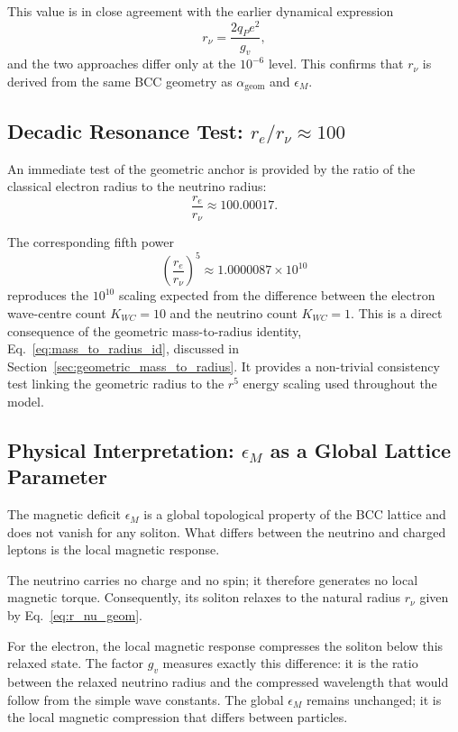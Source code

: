 \documentclass[10pt,a4paper]{article}
\begin{document}
This value is in close agreement with the earlier dynamical expression
\begin{equation}
	r_\nu = \frac{2 q_P e^2}{g_v},
\end{equation}
and the two approaches differ only at the \(10^{-6}\) level. This confirms that \(r_\nu\) is derived from the same BCC geometry as \(\alpha_{\text{geom}}\) and \(\epsilon_M\).

\subsection{Decadic Resonance Test: \(r_e / r_\nu \approx 100\)}
\label{sec:decadic_test}

An immediate test of the geometric anchor is provided by the ratio of the classical electron radius to the neutrino radius:
\begin{equation}
	\frac{r_e}{r_\nu}
	\approx
	100.00017 .
	\label{eq:decadic_ratio}
\end{equation}

The corresponding fifth power
\begin{equation}
	\left(\frac{r_e}{r_\nu}\right)^5
	\approx
	1.0000087 \times 10^{10}
\end{equation}
reproduces the \(10^{10}\) scaling expected from the difference between the electron wave-centre count \(K_{WC}=10\) and the neutrino count \(K_{WC}=1\). This is a direct consequence of the geometric mass-to-radius identity, Eq.~\eqref{eq:mass_to_radius_id}, discussed in Section~\ref{sec:geometric_mass_to_radius}. It provides a non-trivial consistency test linking the geometric radius to the \(r^5\) energy scaling used throughout the model.

\subsection{Physical Interpretation: \(\epsilon_M\) as a Global Lattice Parameter}
\label{sec:neutrino_epsilonM}

The magnetic deficit \(\epsilon_M\) is a global topological property of the BCC lattice and does not vanish for any soliton. What differs between the neutrino and charged leptons is the local magnetic response.

The neutrino carries no charge and no spin; it therefore generates no local magnetic torque. Consequently, its soliton relaxes to the natural radius \(r_\nu\) given by Eq.~\eqref{eq:r_nu_geom}.

For the electron, the local magnetic response compresses the soliton below this relaxed state. The factor \(g_v\) measures exactly this difference: it is the ratio between the relaxed neutrino radius and the compressed wavelength that would follow from the simple wave constants. The global \(\epsilon_M\) remains unchanged; it is the local magnetic compression that differs between particles.
\end{document}
